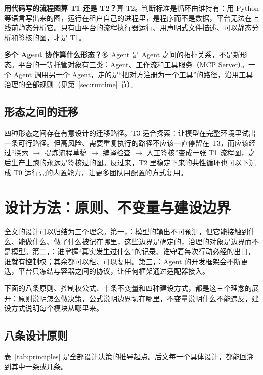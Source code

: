 \textbf{用代码写的流程图算 T1 还是 T2？}算 T2。判断标准是循环由谁持有：用 Python 等语言写出来的图，运行在租户自己的进程里，是程序而不是数据，平台无法在上线前静态分析它。只有由平台的流程执行器运行、用声明式文件描述、可以静态分析和签核的图，才是 T1。

\textbf{多个 Agent 协作算什么形态？}多 Agent 是 Agent 之间的拓扑关系，不是新形态。平台的一等托管对象有三类：Agent、工作流和工具服务（MCP Server）。一个 Agent 调用另一个 Agent，走的是“把对方注册为一个工具”的路径，沿用工具治理的全部规则（见第~\ref{sec:runtime} 节）。

\subsection{形态之间的迁移}

四种形态之间存在有意设计的迁移路径。T3 适合探索：让模型在完整环境里试出一条可行路径。但高风险、需要重复执行的路径不应该一直停留在 T3，而应该经过“探索 $\rightarrow$ 提炼流程草稿 $\rightarrow$ 编译检查 $\rightarrow$ 人工签核”变成一张 T1 流程图，之后生产上跑的永远是签核过的图。反过来，T2 里稳定下来的共性循环也可以下沉成 T0 运行壳的内置能力，让更多团队用配置的方式复用。

\section{设计方法：原则、不变量与建设边界}
\label{sec:method}

全文的设计可以归结为三个理念。第一，：模型的输出不可预测，但它能接触到什么、能做什么、做了什么被记在哪里，这些边界是确定的，治理的对象是边界而不是模型。第二，：谁掌握“真实发生过什么”的记录、谁守着每次行动必经的出口，谁就有控制权；其余都可以租、可以复用。第三，：Agent 的开发框架会不断更迭，平台只冻结与容器之间的协议，让任何框架通过适配器接入。

下面的八条原则、控制权公式、十条不变量和四种建设方式，都是这三个理念的展开：原则说明怎么做决策，公式说明边界切在哪里，不变量说明什么不能违反，建设方式说明每个模块从哪里来。

\subsection{八条设计原则}

表~\ref{tab:principles} 是全部设计决策的推导起点。后文每一个具体设计，都能回溯到其中一条或几条。

